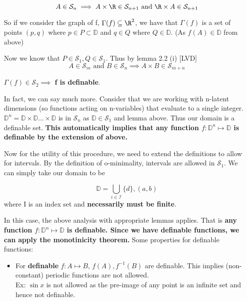 \begin{equation*}
    A \in \mathcal{S}_n\implies A \times\R\in\mathcal{S}_{n+1} \text{ and } \R \times A\in\mathcal{S}_{n+1}
\end{equation*}

So if we consider the graph of f, $\Gamma(f)\subseteq\R^2$, we have that $\Gamma(f)$ is a set of points $(p,q)$ where $p\in P\subset\mathbb{D}$ and $q\in Q$ where $Q\in\mathbb{D}$. (As $f(A)\in\mathbb{D}$ from above)

Now we know that $P\in\mathcal{S}_1, Q\in\mathcal{S}_1$. Thus by lemma 2.2 (i) [LVD]
\begin{equation*}
    A\in\mathcal{S}_m \text{ and } B\in\mathcal{S}_n \implies A\times B\in\mathcal{S}_{m+n}
\end{equation*}

$\Gamma(f)\in\mathcal{S}_2\implies$ \textbf{f is definable}.

In fact, we can say much more. Consider that we are working with n-latent dimensions (so functions acting on n-variables) that evaluate to a single integer. $\mathbb{D}^n = \mathbb{D}\times\mathbb{D}...\times\mathbb{D}$ is in $\mathcal{S}_n$ as $\mathbb{D}\in\mathcal{S}_1$ and lemma above. Thus our domain is a definable set. 
\textbf{This automatically implies that any function $f:\mathbb{D}^n\mapsto\mathbb{D}$ is definable by the extension of above.}

Now for the utility of this procedure, we need to extend the definitions to allow for intervals. By the definition of o-minimality, intervals are allowed in $\mathcal{S}_1$. We can simply take our domain to be

\begin{equation*}
    \mathbb{D} = \bigcup_{i\in\mathcal{I}} \{d\}, (a,b)
\end{equation*}
where I is an index set and \textbf{necessarily must be finite}.

In this case, the above analysis with appropriate lemmas applies. That is \textbf{any function $f:\mathbb{D}^n\mapsto\mathbb{D}$ is definable. Since we have definable functions, we can apply the monotinicity theorem.}
Some properties for definable functions:
\begin{itemize}
    \item For \textbf{ definable } $f:A\mapsto B$, $f(A), f^{-1}(B)$ are definable. This implies (non-constant) periodic functions are not allowed.
    \\
    Ex: $\sin{x}$ is not allowed as the pre-image of any point is an infinite set and hence not definable.
\end{itemize}


